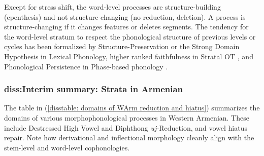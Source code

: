 Except for stress shift, the word-level processes are structure-building (epenthesis) and not structure-changing (no reduction, deletion). A process is structure-changing if it changes features or deletes segments.
The tendency for the word-level stratum to respect the phonological structure of previous levels or cycles has been formalized by Structure-Preservation \citep{Kiparsky-1985-SomeConsequencesOfLexicalPhonology} or the Strong Domain Hypothesis \citep{Myers-1991-StructurePreservationStrongDomainHypothesis} in Lexical Phonology, higher ranked faithfulness in Stratal OT \citep{BermudezOtero-2018-StratalPhonology}, and Phonological Persistence in Phase-based phonology \citep{Newell-2008-PhasesDiss,NewellPiggot-2014-InteractionsMorphoPhonoOjibwe}.
\subsubsection{diss:Interim summary: Strata in Armenian}\label{disssection: reduction: strata elsewhere in WA: summary} 

The table in (\ref{disstable: domains of WArm reduction and hiatus}) summarizes the domains of  various morphophonological processes  in Western Armenian. These include Destressed High Vowel  and Diphthong \textit{uj-}Reduction, and  vowel hiatus repair. %
Note how derivational and inflectional morphology cleanly align  with the stem-level and word-level cophonologies.






